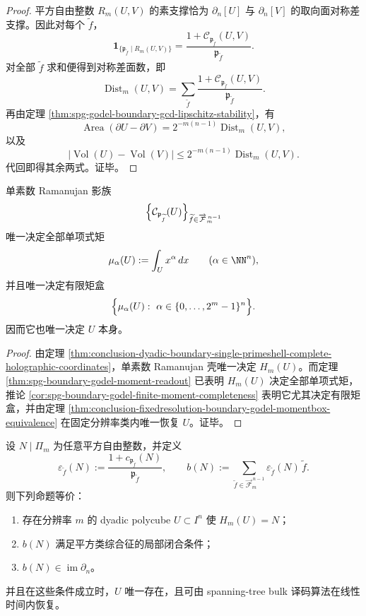 \begin{proof}
平方自由整数 \(R_m(U,V)\) 的素支撑恰为 \(\partial_n[U]\) 与 \(\partial_n[V]\) 的取向面对称差支撑。因此对每个 \(\widetilde f\)，
\[
\mathbf 1_{\{\mathfrak p_{\widetilde f}\mid R_m(U,V)\}}
=
\frac{1+\mathcal C_{\mathfrak p_{\widetilde f}}(U,V)}{\mathfrak p_{\widetilde f}}.
\]
对全部 \(\widetilde f\) 求和便得到对称差面数，即
\[
\operatorname{Dist}_m(U,V)
=
\sum_{\widetilde f}
\frac{1+\mathcal C_{\mathfrak p_{\widetilde f}}(U,V)}{\mathfrak p_{\widetilde f}}.
\]
再由定理 \ref{thm:spg-godel-boundary-gcd-lipschitz-stability}，有
\[
\operatorname{Area}(\partial U-\partial V)=2^{-m(n-1)}\operatorname{Dist}_m(U,V),
\]
以及
\[
\bigl|\operatorname{Vol}(U)-\operatorname{Vol}(V)\bigr|
\le
2^{-m(n-1)}\operatorname{Dist}_m(U,V).
\]
代回即得其余两式。证毕。
\end{proof}

\begin{theorem}\label{thm:conclusion-dyadic-boundary-single-primeshell-determines-moments}
单素数 Ramanujan 影族
\[
\Bigl\{\mathcal C_{\mathfrak p_{\widetilde f}}(U)\Bigr\}_{\widetilde f\in \overrightarrow{\mathcal F}^{\,n-1}_m}
\]
唯一决定全部单项式矩
\[
\mu_\alpha(U):=\int_U x^\alpha\,dx
\qquad
(\alpha\in \NN^n),
\]
并且唯一决定有限矩盒
\[
\Bigl\{\mu_\alpha(U):\ \alpha\in\{0,\dots,2^m-1\}^n\Bigr\}.
\]
因而它也唯一决定 \(U\) 本身。
\end{theorem}

\begin{proof}
由定理 \ref{thm:conclusion-dyadic-boundary-single-primeshell-complete-holographic-coordinates}，单素数 Ramanujan 壳唯一决定 \(H_m(U)\)。而定理 \ref{thm:spg-boundary-godel-moment-readout} 已表明 \(H_m(U)\) 决定全部单项式矩，推论 \ref{cor:spg-boundary-godel-finite-moment-completeness} 表明它尤其决定有限矩盒，并由定理 \ref{thm:conclusion-fixedresolution-boundary-godel-momentbox-equivalence} 在固定分辨率类内唯一恢复 \(U\)。证毕。
\end{proof}

\begin{theorem}\label{thm:conclusion-dyadic-boundary-primeshell-realizability-linear-decode}
设 \(N\mid \Pi_m\) 为任意平方自由整数，并定义
\[
\varepsilon_{\widetilde f}(N):=
\frac{1+c_{\mathfrak p_{\widetilde f}}(N)}{\mathfrak p_{\widetilde f}},
\qquad
b(N):=
\sum_{\widetilde f\in \overrightarrow{\mathcal F}^{\,n-1}_m}
\varepsilon_{\widetilde f}(N)\,\widetilde f.
\]
则下列命题等价：
\begin{enumerate}
  \item 存在分辨率 \(m\) 的 dyadic polycube \(U\subset I^n\) 使 \(H_m(U)=N\)；
  \item \(b(N)\) 满足平方类综合征的局部闭合条件；
  \item \(b(N)\in \operatorname{im}\partial_n\)。
\end{enumerate}
并且在这些条件成立时，\(U\) 唯一存在，且可由 spanning-tree bulk 译码算法在线性时间内恢复。
\end{theorem}


